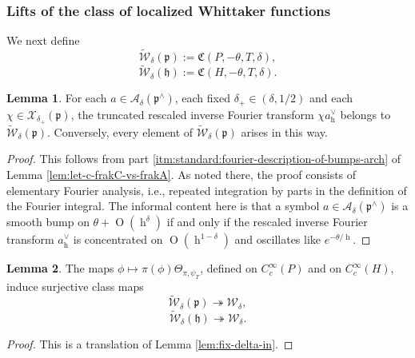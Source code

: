 \documentclass[reqno]{amsart}
\DeclareMathOperator{\h}{h}
\def\O{\operatorname{O}}
\theoremstyle{plain} \newtheorem{theorem} {Theorem}
\theoremstyle{definition} \newtheorem{definition} [theorem] {Definition}
\theoremstyle{itplain} %
\newtheorem{lemma}[theorem]{Lemma}
\numberwithin{equation}{section}
\numberwithin{theorem}{section}
\begin{document}
\subsubsection{Lifts of the class of localized Whittaker functions}
We next define  
\begin{equation*}
  \tilde{\mathcal{W}}_\delta(\mathfrak{p}) := \mathfrak{C}(P, - \theta, T, \delta),
\end{equation*}
\begin{equation*}
  \tilde{\mathcal{W}}_\delta(\mathfrak{h}) := \mathfrak{C}(H, - \theta, T, \delta).
\end{equation*}

\begin{lemma}\label{lem:W-delta-via-Fourier}
  For each $a \in \mathcal{A}_\delta(\mathfrak{p}^\wedge)$, each fixed $\delta_+ \in (\delta,1/2)$ and each $\chi \in \mathcal{X}_{\delta_+}(\mathfrak{p})$, the truncated rescaled inverse Fourier transform $\chi a_{\h}^\vee$ belongs to $\tilde{\mathcal{W}}_{\delta}(\mathfrak{p})$.  Conversely, every element of $\tilde{\mathcal{W}}_{\delta}(\mathfrak{p})$ arises in this way.
\end{lemma}
\begin{proof}
  This follows from part \eqref{itm:standard:fourier-description-of-bumps-arch} of Lemma \ref{lem:let-c-frakC-vs-frakA}.  As noted there, the proof consists of elementary Fourier analysis, i.e., repeated integration by parts in the definition of the Fourier integral.    The informal content here is that a symbol $a \in \mathcal{A}_\delta(\mathfrak{p}^\wedge)$ is a smooth bump on $\theta + \O(\h^\delta)$ if and only if the rescaled inverse Fourier transform $a_{\h}^\vee$ is concentrated on $\O(\h^{1-\delta})$ and oscillates like $e^{-\theta/\h}$.
\end{proof}

\begin{lemma}\label{lem:map-c_cinftyp-ni-tilde-W-delta-W}
  The maps $\phi \mapsto \pi(\phi) \Theta_{\pi,\psi_T}$, defined on $C_c^\infty(P)$ and on $C_c^\infty(H)$, induce surjective class maps
\begin{equation*}
  \tilde{\mathcal{W}}_\delta(\mathfrak{p}) \twoheadrightarrow \mathcal{W}_\delta,
\end{equation*}
\begin{equation*}
  \tilde{\mathcal{W}}_\delta(\mathfrak{h}) \twoheadrightarrow \mathcal{W}_\delta.
\end{equation*}
\end{lemma}
\begin{proof}
  This is a translation of Lemma \ref{lem:fix-delta-in}.
\end{proof}
\end{document}
